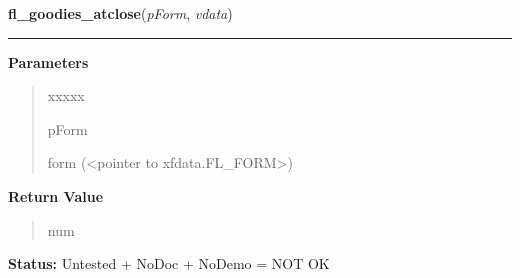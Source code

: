     \vspace{0.5ex}

\hspace{.8\funcindent}\begin{boxedminipage}{\funcwidth}

    \raggedright \textbf{fl\_goodies\_atclose}(\textit{pForm}, \textit{vdata})

    \vspace{-1.5ex}

    \rule{\textwidth}{0.5\fboxrule}
\setlength{\parskip}{2ex}
\setlength{\parskip}{1ex}
      \textbf{Parameters}
      \vspace{-1ex}

      \begin{quote}
        \begin{Ventry}{xxxxx}

          \item[pForm]

          form ({\textless}pointer to xfdata.FL\_FORM{\textgreater})

        \end{Ventry}

      \end{quote}

      \textbf{Return Value}
    \vspace{-1ex}

      \begin{quote}
      num

      \end{quote}

\textbf{Status:} Untested + NoDoc + NoDemo = NOT OK



    \end{boxedminipage}

    \label{xformslib:library:fl_add_input}

    \vspace{0.5ex}

